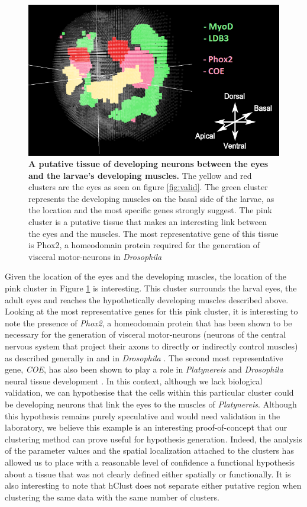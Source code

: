 	\begin{figure}[h]
\centerline{\includegraphics[width=0.6\linewidth]{gfx/chapter6/eyes_muscles.png}}
\caption{{\bf A putative tissue of developing neurons between the eyes and the larvae's developing muscles.} The yellow and red clusters are the eyes as seen on figure \ref{fig:valid}. The green cluster represents the developing muscles on the basal side of the larvae, as the location and the most specific genes strongly suggest. The pink cluster is a putative tissue that makes an interesting link between the eyes and the muscles. The most representative gene of this tissue is Phox2, a homeodomain protein required for the generation of visceral motor-neurons in \emph{Drosophila} \cite{briscoe99}}
\label{fig:eyes_muscles}
	\end{figure}

	Given the location of the eyes and the developing muscles, the location of the pink cluster in Figure \ref{fig:eyes_muscles} is interesting. This cluster surrounds the larval eyes, the adult eyes and reaches the hypothetically developing muscles described above. Looking at the most representative genes for this pink cluster, it is interesting to note the presence of {\it{Phox2}}, a homeodomain protein that has been shown to be necessary for the generation of visceral motor-neurons (neurons of the central nervous system that project their axons to directly or indirectly control muscles) as described generally in \cite{brunet02} and in \emph{Drosophila} \cite{briscoe99}. The second most representative gene, {\it{COE}}, has also been shown to play a role in \emph{Platynereis} and \emph{Drosophila} neural tissue development \cite{demilly11}. In this context, although we lack biological validation, we can hypothesise that the cells within this particular cluster could be developing neurons that link the eyes to the muscles of \emph{Platynereis}. Although this hypothesis remains purely speculative and would need validation in the laboratory, we believe this example is an interesting proof-of-concept that our clustering method can prove useful for hypothesis generation. Indeed, the analysis of the parameter values and the spatial localization attached to the clusters has allowed us to place with a reasonable level of confidence a functional hypothesis about a tissue that was not clearly defined either spatially or functionally. It is also interesting to note that hClust does not separate either putative region when clustering the same data with the same number of clusters. \\

